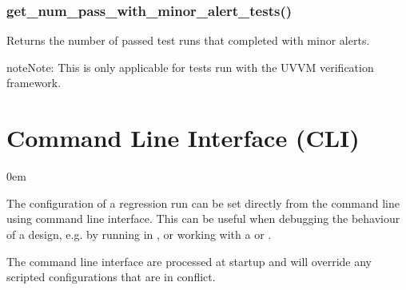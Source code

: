 \documentclass[letterpaper,10pt,english]{sphinxmanual}
\begin{document}
\sphinxAtStartPar
{}

\begin{sphinxVerbatim}[commandchars=\\\{\}]
  
\end{sphinxVerbatim}


\subsection{get\_num\_pass\_with\_minor\_alert\_tests()}
\label{\detokenize{api:get-num-pass-with-minor-alert-tests}}
\sphinxAtStartPar
Returns the number of passed test runs that completed with minor alerts.

\begin{sphinxadmonition}{note}{Note:}
\sphinxAtStartPar
This is only applicable for tests run with the UVVM verification framework.
\end{sphinxadmonition}

\begin{sphinxVerbatim}[commandchars=\\\{\}]
\end{sphinxVerbatim}

\sphinxAtStartPar
{}

\begin{sphinxVerbatim}[commandchars=\\\{\}]
  
\end{sphinxVerbatim}

\sphinxstepscope


\chapter{Command Line Interface (CLI)}
\label{\detokenize{cli:command-line-interface-cli}}\label{\detokenize{cli::doc}}
\begin{DUlineblock}{0em}
\item[] The configuration of a regression run can be set directly from the command line using command line interface.
This can be useful when debugging the behaviour of a design, e.g. by running in {\hyperref[\detokenize{gui::doc}]{}},
or working with a {\hyperref[\detokenize{intro:test-case}]{}} or {\hyperref[\detokenize{intro:test-group}]{}}.
\item[] The command line interface are processed at startup and will override any scripted configurations that are in conflict.
\end{DUlineblock}
\end{document}
